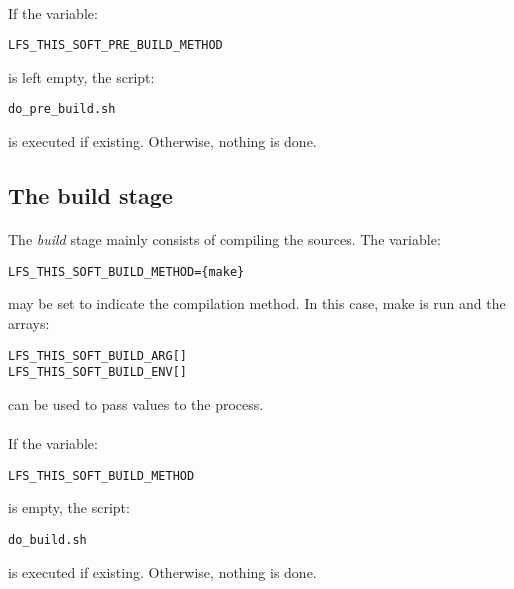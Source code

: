 \documentclass[a4paper, 11pt]{article}
\begin{document}
\paragraph{}
If the variable:\\

\begin{lstlisting}[frame=tb]
LFS_THIS_SOFT_PRE_BUILD_METHOD
\end{lstlisting}
is left empty, the script:\\
\begin{lstlisting}[frame=tb]
do_pre_build.sh
\end{lstlisting}
is executed if existing. Otherwise, nothing is done.

\subsection{The build stage}
\paragraph{}
The \textit{build} stage mainly consists of compiling the sources. The variable:\\

\begin{lstlisting}[frame=tb]
LFS_THIS_SOFT_BUILD_METHOD={make}
\end{lstlisting}
may be set to indicate the compilation method. In this case, make is run and the
arrays:\\

\begin{lstlisting}[frame=tb]
LFS_THIS_SOFT_BUILD_ARG[]
LFS_THIS_SOFT_BUILD_ENV[]
\end{lstlisting}
can be used to pass values to the process.

\paragraph{}
If the variable:\\

\begin{lstlisting}[frame=tb]
LFS_THIS_SOFT_BUILD_METHOD
\end{lstlisting}
is empty, the script:\\

\begin{lstlisting}[frame=tb]
do_build.sh
\end{lstlisting}
is executed if existing. Otherwise, nothing is done.
\end{document}
